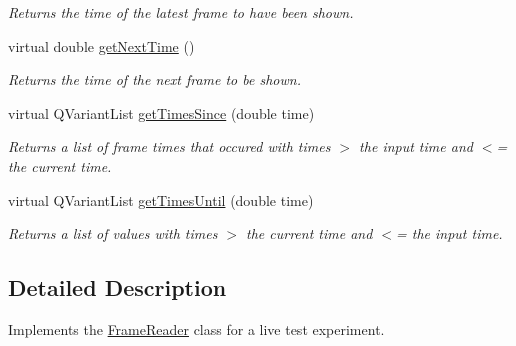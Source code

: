 \begin{DoxyCompactItemize}
\begin{DoxyCompactList}\small\item\em Returns the time of the latest frame to have been shown. \end{DoxyCompactList}\item 
\hypertarget{class_picto_1_1_live_frame_reader_ad91339bded3baafeab320dbc089f91dc}{virtual double \hyperlink{class_picto_1_1_live_frame_reader_ad91339bded3baafeab320dbc089f91dc}{get\-Next\-Time} ()}\label{class_picto_1_1_live_frame_reader_ad91339bded3baafeab320dbc089f91dc}

\begin{DoxyCompactList}\small\item\em Returns the time of the next frame to be shown. \end{DoxyCompactList}\item 
\hypertarget{class_picto_1_1_live_frame_reader_ae59d5baff10449eee6fc8df2c518eac0}{virtual Q\-Variant\-List \hyperlink{class_picto_1_1_live_frame_reader_ae59d5baff10449eee6fc8df2c518eac0}{get\-Times\-Since} (double time)}\label{class_picto_1_1_live_frame_reader_ae59d5baff10449eee6fc8df2c518eac0}

\begin{DoxyCompactList}\small\item\em Returns a list of frame times that occured with times $>$ the input time and $<$= the current time. \end{DoxyCompactList}\item 
\hypertarget{class_picto_1_1_live_frame_reader_a10bd0824df11c12486b1ecec99a84f6a}{virtual Q\-Variant\-List \hyperlink{class_picto_1_1_live_frame_reader_a10bd0824df11c12486b1ecec99a84f6a}{get\-Times\-Until} (double time)}\label{class_picto_1_1_live_frame_reader_a10bd0824df11c12486b1ecec99a84f6a}

\begin{DoxyCompactList}\small\item\em Returns a list of values with times $>$ the current time and $<$= the input time. \end{DoxyCompactList}\end{DoxyCompactItemize}


\subsection{Detailed Description}
Implements the \hyperlink{class_picto_1_1_frame_reader}{Frame\-Reader} class for a live test experiment. 


